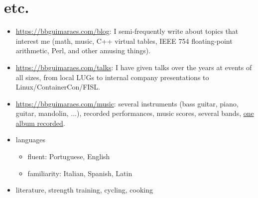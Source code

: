 \section*{etc.}
\label{sec:etc}

\begin{itemize}
    \item
        \url{https://bbguimaraes.com/blog}: I semi-frequently write about topics
        that interest me (math, music, C++ virtual tables, IEEE 754
        floating-point arithmetic, Perl, and other amusing things).
    \item
        \url{https://bbguimaraes.com/talks}: I have given talks over the years
        at events of all sizes, from local LUGs to internal company
        presentations to Linux\slash ContainerCon\slash FISL.
    \item
        \url{https://bbguimaraes.com/music}: several instruments (bass guitar,
        piano, guitar, mandolin, ...), recorded performances, music scores,
        several bands, \href{https://www.youtube.com/larajackpot}{one album
        recorded}.
    \item
        languages
        \begin{itemize}
            \item fluent: Portuguese, English
            \item familiarity: Italian, Spanish, Latin
        \end{itemize}
    \item literature, strength training, cycling, cooking
\end{itemize}
